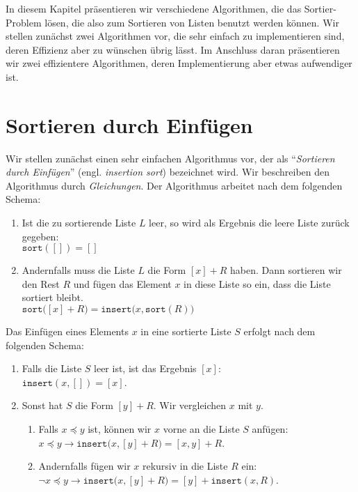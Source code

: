 In diesem Kapitel pr\"asentieren wir verschiedene Algorithmen, die das Sortier-Problem
l\"osen, die also  zum Sortieren von Listen benutzt werden k\"onnen.
Wir stellen zun\"achst zwei Algorithmen vor, die sehr einfach zu implementieren sind, deren
Effizienz aber zu w\"unschen \"ubrig l\"asst.  Im Anschluss daran pr\"asentieren wir zwei
effizientere Algorithmen, deren Implementierung aber etwas aufwendiger ist.

\section{Sortieren durch Einf\"ugen}
Wir stellen zun\"achst einen sehr einfachen Algorithmus vor, der als 
``\emph{Sortieren durch Einf\"ugen}'' (engl. \emph{insertion sort}) bezeichnet wird.
Wir beschreiben den Algorithmus durch \emph{Gleichungen}.
Der Algorithmus arbeitet nach dem folgenden Schema:
\begin{enumerate}
\item Ist die zu sortierende Liste $L$ leer, so wird als Ergebnis
      die leere Liste zur\"uck gegeben: \\[0.1cm]
      \hspace*{1.3cm} $\mathtt{sort}([]) = []$
\item Andernfalls muss die Liste $L$ die Form $[x] + R$ haben.
      Dann sortieren wir den Rest $R$ und f\"ugen das Element $x$ in diese Liste so ein,
      dass die Liste sortiert bleibt. \\[0.1cm]
      \hspace*{1.3cm} $\mathtt{sort}\bigl([x] + R\bigr) = \mathtt{insert}\bigl(x, \mathtt{sort}(R)\bigr)$
\end{enumerate}
Das Einf\"ugen eines Elements $x$ in eine sortierte Liste $S$ erfolgt nach dem folgenden Schema:
\begin{enumerate}
\item Falls die Liste $S$ leer ist, ist das Ergebnis $[x]$: \\[0.1cm]
      \hspace*{1.3cm} $\mathtt{insert}(x,[]) = [x]$.
\item Sonst hat $S$ die Form $[y] + R$.  Wir vergleichen $x$ mit $y$.
      \begin{enumerate}
      \item Falls $x \preceq y$ ist, k\"onnen wir $x$ vorne an die Liste $S$ anf\"ugen: \\[0.1cm]
            \hspace*{1.3cm} $x \preceq y \rightarrow \mathtt{insert}\bigl(x, [y] + R\bigr) = [x,y] + R$. 
      \item Andernfalls f\"ugen wir $x$ rekursiv in die Liste $R$ ein: \\[0.1cm]
            \hspace*{1.3cm} $\neg x \preceq y \rightarrow \mathtt{insert}\bigl(x, [y] + R\bigr) = [y] + \mathtt{insert}(x,R)$. 
      \end{enumerate}
\end{enumerate}
